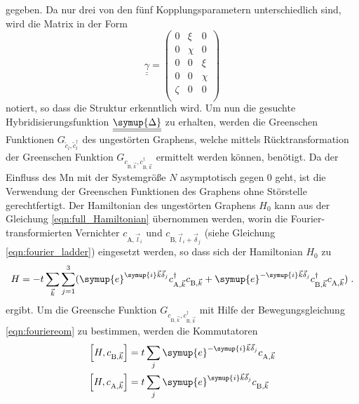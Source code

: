 gegeben.
Da nur drei von den fünf Kopplungsparametern unterschiedlich sind, wird die Matrix in der Form  
\begin{equation}
    \underline{\underline{\gamma}} = 
   \begin{pmatrix}
       0               & \xi    &   0           \\
       0               & \chi   &   0           \\
       0               & 0             &   \xi \\
       0               & 0             &   \chi \\
       \zeta     & 0             &   0           \\
   \end{pmatrix} \label{eqn:gammakopcrazy}
\end{equation} 
notiert, so dass die Struktur erkenntlich wird.
Um nun die gesuchte Hybridisierungsfunktion $\underline{\underline{\symup{\Delta}}}$ zu erhalten, werden die Greenschen Funktionen
$G_{\tilde{c}_l, \tilde{c}_l^{\dagger}}$ des ungestörten Graphens, welche mittels Rücktransformation der Greenschen Funktion 
$G_{c_{\text{B}, \vec{k}}, c_{\text{B}, \vec{k}}^\dagger}$ ermittelt werden können, benötigt.
Da der Einfluss des Mn mit der Systemgröße $N$ asymptotisch gegen 0 geht, ist die Verwendung der 
Greenschen Funktionen des Graphens ohne Störstelle gerechtfertigt.
Der Hamiltonian des ungestörten Graphens $H_0$ kann aus der Gleichung \eqref{eqn:full_Hamiltonian} übernommen werden,
worin die Fourier-transformierten Vernichter $c_{\text{A},\vec{l}_i}$ und $c_{\text{B},\vec{l}_i+\vec{\delta}_j}$ (siehe Gleichung \eqref{eqn:fourier_ladder}) eingesetzt werden,
so dass sich der Hamiltonian $H_0$ zu  
\begin{equation}
    H = -t \sum_{\vec{k}}\sum_{j=1}^3( \symup{e}^{\symup{i}\vec{k}\vec{\delta}_j}c^\dagger_{\text{A},\vec{k}} c_{\text{B},\vec{k}} + \symup{e}^{-\symup{i}\vec{k}\vec{\delta}_j}c^\dagger_{\text{B},\vec{k}} c_{\text{A},\vec{k}} ) \; .
\end{equation} 
ergibt.
Um die Greensche Funktion $G_{c_{\text{B}, \vec{k}}, c_{\text{B}, \vec{k}}^\dagger}$ mit Hilfe der Bewegungsgleichung \eqref{eqn:fouriereom} zu bestimmen, werden die Kommutatoren
\begin{align}
    \left [H,  c_{\text{B},\vec{k}} \right ] &= t \sum_j \symup{e}^{-\symup{i}\vec{k}\vec{\delta}_j} c_{\text{A},\vec{k}} \label{eqn:test} \\
    \left [H,  c_{\text{A},\vec{k}} \right ] &= t \sum_j \symup{e}^{\symup{i}\vec{k}\vec{\delta}_j} c_{\text{B},\vec{k}}
\end{align}
